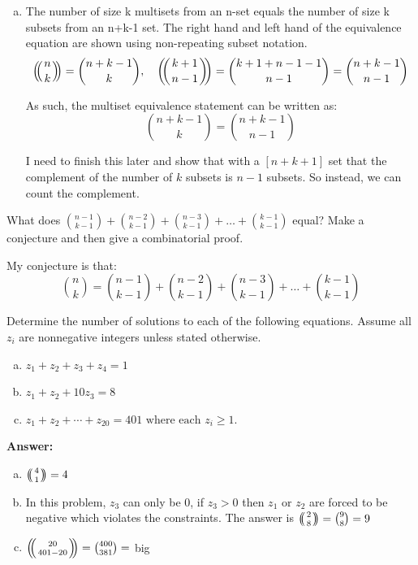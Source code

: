 \documentclass{article}
\begin{document}
\begin{enumerate}[(a)]
    \medskip
    For the identity to be valid, $n > k > j$.

    \item The number of size k multisets from an n-set equals the number of size k subsets from an n+k-1 set. The right hand and left hand of the equivalence equation are shown using non-repeating subset notation.
    \begin{equation*}
        \multiset{n}{k} = \binom{n+k-1}{k}, \quad \multiset{k+1}{n-1} = \binom{k+1+n-1-1}{n-1} = \binom{n+k-1}{n-1}
    \end{equation*}

    As such, the multiset equivalence statement can be written as:
    \begin{equation*}
        \binom{n+k-1}{k} = \binom{n+k-1}{n-1}
    \end{equation*}
    
    I need to finish this later and show that with a $[n+k+1]$ set that the complement of the number of $k$ subsets is $n-1$ subsets. So instead, we can count the complement. 
    \end{enumerate}

\begin{problem} %
What does $\binom{n-1}{k-1} + \binom{n-2}{k-1} + \binom{n-3}{k-1} + \dots + \binom{k-1}{k-1}$ equal? Make a conjecture and then give a combinatorial proof.
\end{problem}

My conjecture is that:
\begin{equation*}
    \binom{n}{k} = \binom{n-1}{k-1} + \binom{n-2}{k-1} + \binom{n-3}{k-1} + \dots + \binom{k-1}{k-1}
\end{equation*}

\setcounter{problem}{6}
\begin{problem} %
Determine the number of solutions to each of the following equations. Assume all $z_i$ are nonnegative integers unless stated otherwise.
\begin{enumerate}[(a)]
    \item $z_1 + z_2 + z_3 + z_4 = 1$
    \item $z_1 + z_2 + 10z_3 = 8$
    \item $z_1 + z_2 + \cdots + z_{20} = 401 \text{ where each } z_i \ge 1$.
\end{enumerate}
\end{problem}

\textbf{Answer:}
\begin{enumerate}[(a)]
    \item $\multiset{4}{1} = 4$
    \item In this problem, $z_3$ can only be 0, if $z_3 > 0$ then $z_1$ or $z_2$ are forced to be negative which violates the constraints. The answer is $\multiset{2}{8} = \binom{9}{8} = 9$
    \item $\multiset{20}{401-20} = \binom{400}{381} =$ big
\end{enumerate}
\end{document}

